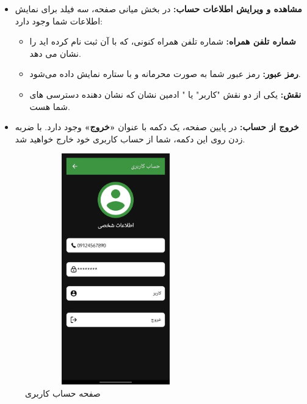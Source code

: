 \documentclass{report}
\begin{document}
\begin{itemize}
	\item \textbf{مشاهده و ویرایش اطلاعات حساب:}  
	در بخش میانی صفحه، سه فیلد برای نمایش اطلاعات شما وجود دارد:
	\begin{itemize}
		\item \textbf{شماره تلفن همراه:} شماره تلفن همراه کنونی، که با آن ثبت نام کرده اید را نشان می دهد.
		\item \textbf{رمز عبور:} رمز عبور شما به صورت محرمانه و با ستاره نمایش داده می‌شود.
		\item \textbf{نقش:} یکی از دو نقش "کاربر" یا " ادمین نشان که نشان دهنده دسترسی های شما هست.
	\end{itemize}
	
	\item \textbf{خروج از حساب:}  
	در پایین صفحه، یک دکمه با عنوان \textbf{«خروج»} وجود دارد. با ضربه زدن روی این دکمه، شما از حساب کاربری خود خارج خواهید شد.
\end{itemize}

 
  \begin{figure}[ht]
 	\centering
 	\includegraphics[width=0.7\textwidth,height=10cm,keepaspectratio]{Pic/profile}
 	\caption{صفحه حساب کاربری}
 	\label{fig:profile}
 \end{figure}
\end{document}

